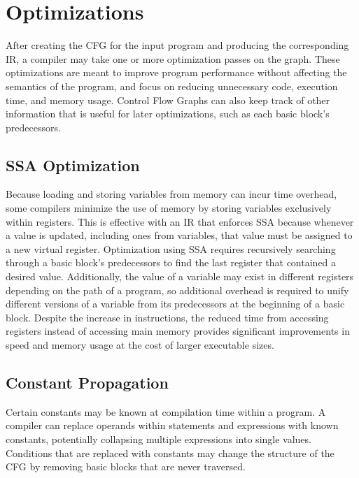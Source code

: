 \section{Optimizations}
After creating the CFG for the input program and producing the corresponding IR, a compiler may take one or more optimization passes on the graph. These optimizations are meant to improve program performance without affecting the semantics of the program, and focus on reducing unnecessary code, execution time, and memory usage. Control Flow Graphs can also keep track of other information that is useful for later optimizations, such as each basic block's predecessors.

\subsection{SSA Optimization}
Because loading and storing variables from memory can incur time overhead, some compilers minimize the use of memory by storing variables exclusively within registers. This is effective with an IR that enforces SSA because whenever a value is updated, including ones from variables, that value must be assigned to a new virtual register. Optimization using SSA requires recursively searching through a basic block's predecessors to find the last register that contained a desired value. Additionally, the value of a variable may exist in different registers depending on the path of a program, so additional overhead is required to unify different versions of a variable from its predecessors at the beginning of a basic block. Despite the increase in instructions, the reduced time from accessing registers instead of accessing main memory provides significant improvements in speed and memory usage at the cost of larger executable sizes.

\subsection{Constant Propagation}
Certain constants may be known at compilation time within a program. A compiler can replace operands within statements and expressions with known constants, potentially collapsing multiple expressions into single values. Conditions that are replaced with constants may change the structure of the CFG by removing basic blocks that are never traversed.

